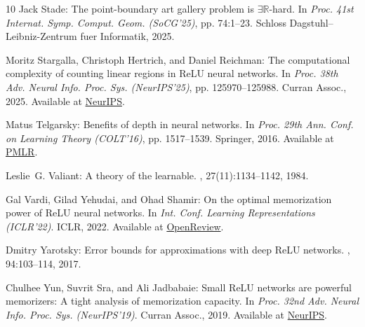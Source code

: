 \begin{thebibliography}{10}
{\sc Jack Stade}: The point-boundary art gallery problem is
  $\exists\mathbb{R}$-hard.
\newblock In {\em Proc. 41st Internat. Symp. Comput. Geom. (SoCG'25)}, pp.
  74:1--23. Schloss Dagstuhl--Leibniz-Zentrum fuer Informatik, 2025.

{\sc Moritz Stargalla, Christoph Hertrich, and Daniel Reichman}: The
  computational complexity of counting linear regions in {ReLU} neural
  networks.
\newblock In {\em Proc. 38th Adv. Neural Info. Proc. Sys. (NeurIPS'25)}, pp.
  125970--125988. Curran Assoc., 2025.
\newblock Available at
  \href{https://papers.nips.cc/paper_files/paper/2025/hash/b74391e2cc31c765948a306ef000b313-Abstract-Conference.html}{NeurIPS}.

{\sc Matus Telgarsky}: Benefits of depth in neural networks.
\newblock In {\em Proc. 29th Ann. Conf. on Learning Theory (COLT'16)}, pp.
  1517--1539. Springer, 2016.
\newblock Available at
  \href{https://proceedings.mlr.press/v49/telgarsky16.html}{PMLR}.

{\sc Leslie~G. Valiant}: A theory of the learnable.
, 27(11):1134--1142, 1984.
\newblock [\epfmtdoi{10.1145/1968.1972}]

{\sc Gal Vardi, Gilad Yehudai, and Ohad Shamir}: On the optimal memorization
  power of {ReLU} neural networks.
\newblock In {\em Int. Conf. Learning Representations (ICLR'22)}. ICLR, 2022.
\newblock Available at
  \href{https://openreview.net/forum?id=MkTPtnjeYTV}{OpenReview}.

{\sc Dmitry Yarotsky}: Error bounds for approximations with deep {ReLU}
  networks.
, 94:103--114, 2017.

{\sc Chulhee Yun, Suvrit Sra, and Ali Jadbabaie}: Small {ReLU} networks are
  powerful memorizers: {A} tight analysis of memorization capacity.
\newblock In {\em Proc. 32nd Adv. Neural Info. Proc. Sys. (NeurIPS'19)}. Curran
  Assoc., 2019.
\newblock Available at
  \href{https://papers.nips.cc/paper_files/paper/2019/hash/dbea3d0e2a17c170c412c74273778159-Abstract.html}{NeurIPS}.


\end{thebibliography}
